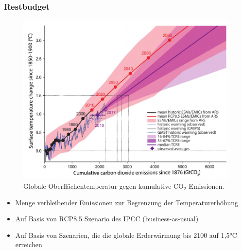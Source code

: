 \begin{frame}
    \frametitle{Restbudget}    
	\begin{figure}
		\centering
		\includegraphics[height=.6\textheight]{bilder/cumulative_co2.pdf}
		\caption{Globale Oberflächentemperatur gegen kumulative CO$_2$-Emissionen.}
    \end{figure}
    
    \begin{itemize}
        \item Menge verbleibender Emissionen zur Begrenzung der Temperaturerhöhung
        \item Auf Basis von RCP8.5 Szenario des IPCC (business-as-usual)
        \item Auf Basis von Szenarien, die die globale Erderwärmung bis 2100 auf 1,5°C erreichen
    \end{itemize}
\end{frame}

